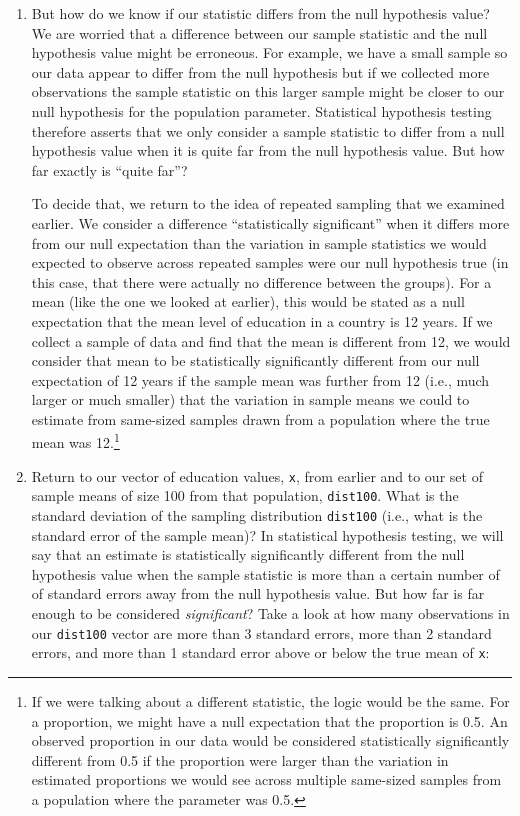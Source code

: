 \documentclass[a4paper,12pt]{article}
\begin{document}
\begin{enumerate}
\item But how do we know if our statistic differs from the null hypothesis value? We are worried that a difference between our sample statistic and the null hypothesis value might be erroneous. For example, we have a small sample so our data appear to differ from the null hypothesis but if we collected more observations the sample statistic on this larger sample might be closer to our null hypothesis for the population parameter. Statistical hypothesis testing therefore asserts that we only consider a sample statistic to differ from a null hypothesis value when it is quite far from the null hypothesis value. But how far exactly is ``quite far''?

To decide that, we return to the idea of repeated sampling that we examined earlier. We consider a difference ``statistically significant'' when it differs more from our null expectation than the variation in sample statistics we would expected to observe across repeated samples were our null hypothesis true (in this case, that there were actually no difference between the groups). For a mean (like the one we looked at earlier), this would be stated as a null expectation that the mean level of education in a country is 12 years. If we collect a sample of data and find that the mean is different from 12, we would consider that mean to be statistically significantly different from our null expectation of 12 years if the sample mean was further from 12 (i.e., much larger or much smaller) that the variation in sample means we could to estimate from same-sized samples drawn from a population where the true mean was 12.\footnote{If we were talking about a different statistic, the logic would be the same. For a proportion, we might have a null expectation that the proportion is 0.5. An observed proportion in our data would be considered statistically significantly different from 0.5 if the proportion were larger than the variation in estimated proportions we would see across multiple same-sized samples from a population where the parameter was 0.5.} 

\item Return to our vector of education values, \texttt{x}, from earlier and to our set of sample means of size 100 from that population, \texttt{dist100}. What is the standard deviation of the sampling distribution \texttt{dist100} (i.e., what is the standard error of the sample mean)? In statistical hypothesis testing, we will say that an estimate is statistically significantly different from the null hypothesis value when the sample statistic is more than a certain number of of standard errors away from the null hypothesis value. But how far is far enough to be considered \textit{significant}? Take a look at how many observations in our \texttt{dist100} vector are more than 3 standard errors, more than 2 standard errors, and more than 1 standard error above or below the true mean of \texttt{x}:


\end{enumerate}
\end{document}
